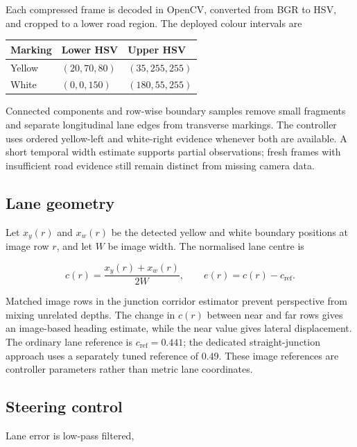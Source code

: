 \documentclass[10pt,a4paper,twocolumn]{article}
\begin{document}
Each compressed frame is decoded in OpenCV, converted from BGR to HSV, and
cropped to a lower road region. The deployed colour intervals are

\begin{center}
\begin{tabular}{lll}
\toprule
Marking & Lower HSV & Upper HSV \\
\midrule
Yellow & $(20,70,80)$ & $(35,255,255)$ \\
White  & $(0,0,150)$ & $(180,55,255)$ \\
\bottomrule
\end{tabular}
\end{center}

Connected components and row-wise boundary samples remove small fragments and
separate longitudinal lane edges from transverse markings. The controller uses
ordered yellow-left and white-right evidence whenever both are available. A
short temporal width estimate supports partial observations; fresh frames with
insufficient road evidence still remain distinct from missing camera data.

\subsection{Lane geometry}

Let $x_y(r)$ and $x_w(r)$ be the detected yellow and white boundary positions at
image row $r$, and let $W$ be image width. The normalised lane centre is

\begin{equation}
 c(r)=\frac{x_y(r)+x_w(r)}{2W}, \qquad e(r)=c(r)-c_{\mathrm{ref}} .
\end{equation}

Matched image rows in the junction corridor estimator prevent perspective
from mixing unrelated depths.
The change in $c(r)$ between near and far rows gives an image-based heading
estimate, while the near value gives lateral displacement. The ordinary lane reference is $c_{\mathrm{ref}}=0.441$; the dedicated
straight-junction approach uses a separately tuned reference of $0.49$. These
image references are controller parameters rather than metric lane coordinates.

\subsection{Steering control}

Lane error is low-pass filtered,
\end{document}
